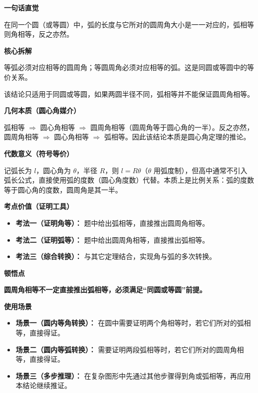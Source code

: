 \begin{explanationbox}
	\textbf{\textcolor{CExplanation}{一句话直觉}}

	在同一个圆（或等圆）中，弧的长度与它所对的圆周角大小是一一对应的，弧相等则角相等，反之亦然。

	\medskip
	\textbf{\textcolor{CExplanation}{核心拆解}}
	\begin{description}[style=nextline, leftmargin=2.8em, labelsep=0.5em, itemsep=0.45em]
		\item[\textbf{要点一（弧角对应）：}] 等弧必须对应相等的圆周角；等圆周角必须对应相等的弧。这是同圆或等圆中的等价关系。
		\item[\textbf{要点二（同圆前提）：}] 该结论只适用于同圆或等圆，如果两圆半径不同，弧相等并不能保证圆周角相等。
	\end{description}

	\medskip
	\textbf{\textcolor{CExplanation}{几何本质（圆心角媒介）}}

	弧相等 $\Rightarrow$ 圆心角相等 $\Rightarrow$ 圆周角相等（圆周角等于圆心角的一半）。反之亦然，圆周角相等 $\Rightarrow$ 圆心角相等 $\Rightarrow$ 弧相等。因此该结论本质是圆心角定理的推论。

	\medskip
	\textbf{\textcolor{CExplanation}{代数意义（符号等价）}}

	记弧长为 $l$，圆心角为 $\theta$，半径 $R$，则 $l = R\theta$（$\theta$ 用弧度制），但高中通常不引入弧长公式，直接使用弧的度数（圆心角度数）代替。本质上是比例关系：弧的度数等于圆心角的度数，圆周角是其一半。

	\medskip
	\textbf{\textcolor{CExplanation}{考点价值（证明工具）}}
	\begin{itemize}[leftmargin=*, itemsep=0.5em, topsep=0.4em]
		\item \textbf{考法一（证明角等）：} 题中给出弧相等，直接推出圆周角相等。
		\item \textbf{考法二（证明弧等）：} 题中给出圆周角相等，直接推出弧相等。
		\item \textbf{考法三（综合转换）：} 与其它定理结合，实现角与弧的多次转换。
	\end{itemize}

	\medskip
	\textbf{\textcolor{CExplanation}{顿悟点}}

	\textbf{圆周角相等不一定直接推出弧相等，必须满足“同圆或等圆”前提。}

	\medskip
	\textbf{\textcolor{CExplanation}{使用场景}}
	\begin{itemize}[leftmargin=*, itemsep=0.5em, topsep=0.4em]
		\item \textbf{场景一（圆内等角转换）：} 在圆中需要证明两个角相等时，若它们所对的弧相等，直接得证。
		\item \textbf{场景二（圆内等弧转换）：} 需要证明两段弧相等时，若它们所对的圆周角相等，直接得证。
		\item \textbf{场景三（多步推理）：} 在复杂图形中先通过其他步骤得到角或弧相等，再应用本结论继续推证。
	\end{itemize}
\end{explanationbox}
